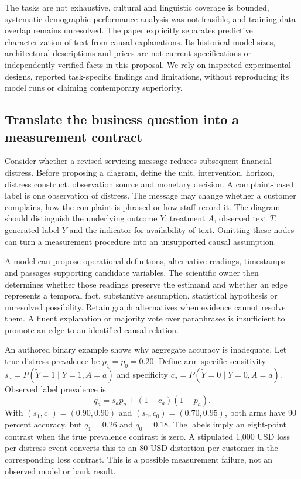 The tasks are not exhaustive, cultural and linguistic coverage is bounded, systematic demographic performance analysis was not feasible, and training-data overlap remains unresolved. The paper explicitly separates predictive characterization of text from causal explanations. Its historical model sizes, architectural descriptions and prices are not current specifications or independently verified facts in this proposal. We rely on inspected experimental designs, reported task-specific findings and limitations, without reproducing its model runs or claiming contemporary superiority.\citep{exec24_css_original}

\subsection{Translate the business question into a measurement contract}
Consider whether a revised servicing message reduces subsequent financial distress. Before proposing a diagram, define the unit, intervention, horizon, distress construct, observation source and monetary decision. A complaint-based label is one observation of distress. The message may change whether a customer complains, how the complaint is phrased or how staff record it. The diagram should distinguish the underlying outcome $Y$, treatment $A$, observed text $T$, generated label $\widetilde Y$ and the indicator for availability of text. Omitting these nodes can turn a measurement procedure into an unsupported causal assumption.\citep{exec24_css_knowledge_reference}

A model can propose operational definitions, alternative readings, timestamps and passages supporting candidate variables. The scientific owner then determines whether those readings preserve the estimand and whether an edge represents a temporal fact, substantive assumption, statistical hypothesis or unresolved possibility. Retain graph alternatives when evidence cannot resolve them. A fluent explanation or majority vote over paraphrases is insufficient to promote an edge to an identified causal relation.\citep{exec24_css_knowledge_reference}

An authored binary example shows why aggregate accuracy is inadequate. Let true distress prevalence be $p_1=p_0=0.20$. Define arm-specific sensitivity $s_a=P(\widetilde Y=1\mid Y=1,A=a)$ and specificity $c_a=P(\widetilde Y=0\mid Y=0,A=a)$. Observed label prevalence is
\[
 q_a=s_a p_a+(1-c_a)(1-p_a).
\]
With $(s_1,c_1)=(0.90,0.90)$ and $(s_0,c_0)=(0.70,0.95)$, both arms have 90 percent accuracy, but $q_1=0.26$ and $q_0=0.18$. The labels imply an eight-point contrast when the true prevalence contrast is zero. A stipulated 1,000 USD loss per distress event converts this to an 80 USD distortion per customer in the corresponding loss contrast. This is a possible measurement failure, not an observed model or bank result.\citep{exec24_css_knowledge_reference}

